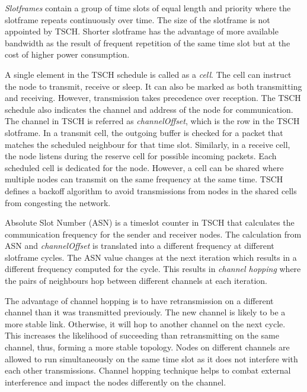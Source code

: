 \textit{Slotframes} contain a group of time slots of equal length and priority where the slotframe repeats continuously over time. The size of the slotframe is not appointed by TSCH. Shorter slotframe has the advantage of more available bandwidth as the result of frequent repetition of the same time slot but at the cost of higher power consumption. 

A single element in the TSCH schedule is called as a \textit{cell}. The cell can instruct the node to transmit, receive or sleep. It can also be marked as both transmitting and receiving. However, transmission takes precedence over reception. The TSCH schedule also indicates the channel and address of the node for communication. The channel in TSCH is referred as \textit{channelOffset}, which is the row in the TSCH slotframe. In a transmit cell, the outgoing buffer is checked for a packet that matches the scheduled neighbour for that time slot. Similarly, in a receive cell, the node listens during the reserve cell for possible incoming packets. Each scheduled cell is dedicated for the node. However, a cell can be shared where multiple nodes can transmit on the same frequency at the same time. TSCH defines a backoff algorithm to avoid transmissions from nodes in the shared cells from congesting the network.

Absolute Slot Number (ASN) is a timeslot counter in TSCH that calculates the communication frequency for the sender and receiver nodes. The calculation from ASN and \textit{channelOffset} is translated into a different frequency at different slotframe cycles. The ASN value changes at the next iteration which results in a different frequency computed for the cycle. This results in \textit{channel hopping} where the pairs of neighbours hop between different channels at each iteration.

The advantage of channel hopping is to have retransmission on a different channel than it was transmitted previously. The new channel is likely to be a more stable link. Otherwise, it will hop to another channel on the next cycle. This increases the likelihood of succeeding than retransmitting on the same channel, thus, forming a more stable topology. Nodes on different channels are allowed to run simultaneously on the same time slot as it does not interfere with each other transmissions. Channel hopping technique helps to combat external interference and impact the nodes differently on the channel.


